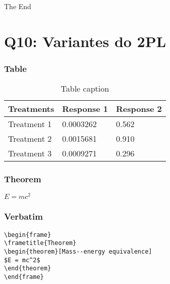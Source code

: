 \documentclass{beamer}
\begin{document}

\begin{frame}
\Huge{\centerline{The End}}
\end{frame}


\section{Q10: Variantes do 2PL}

\begin{frame}
\frametitle{Table}
\begin{table}
\begin{tabular}{l l l}
\toprule
\textbf{Treatments} & \textbf{Response 1} & \textbf{Response 2}\\
\midrule
Treatment 1 & 0.0003262 & 0.562 \\
Treatment 2 & 0.0015681 & 0.910 \\
Treatment 3 & 0.0009271 & 0.296 \\
\bottomrule
\end{tabular}
\caption{Table caption}
\end{table}
\end{frame}


\begin{frame}
\frametitle{Theorem}
\begin{theorem}
$E = mc^2$
\end{theorem}
\end{frame}


\begin{frame}[fragile] %
\frametitle{Verbatim}
\begin{example}
\begin{verbatim}
\begin{frame}
\frametitle{Theorem}
\begin{theorem}[Mass--energy equivalence]
$E = mc^2$
\end{theorem}
\end{frame}\end{verbatim}
\end{example}
\end{frame}
\end{document}
